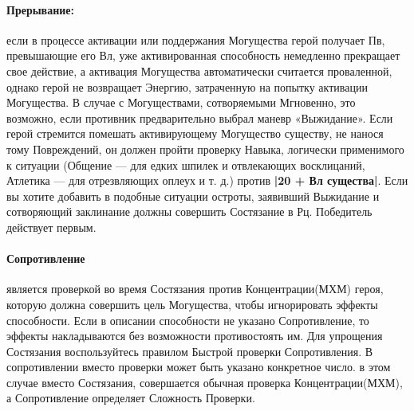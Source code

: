 \paragraph{Прерывание:} если в процессе активации или поддержания Могущества герой получает Пв, превышающие его Вл, уже активированная способность немедленно прекращает свое действие, а активация Могущества автоматически считается проваленной, однако герой не возвращает Энергию, затраченную на попытку активации Могущества. В случае с Могуществами, сотворяемыми Мгновенно, это возможно, если противник предварительно выбрал маневр «Выжидание».
\newline
Если герой стремится помешать активирующему Могущество существу, не нанося тому Повреждений, он должен пройти проверку Навыка, логически применимого к ситуации (Общение — для едких шпилек и отвлекающих восклицаний, Атлетика — для отрезвляющих оплеух и т. д.) против \textbf{|20 + Вл существа|}.
\newline
Если вы хотите добавить в подобные ситуации остроты, заявивший Выжидание и сотворяющий заклинание должны совершить Состязание в Рц. Победитель действует первым.
\paragraph{Сопротивление} является проверкой во время Состязания против Концентрации(МХМ) героя, которую должна совершить цель Могущества, чтобы игнорировать эффекты способности. Если в описании способности не указано Сопротивление, то эффекты накладываются без возможности противостоять им. Для упрощения Состязания воспользуйтесь правилом Быстрой проверки Сопротивления. В сопротивлении вместо проверки может быть указано конкретное число. в этом случае вместо Состязания, совершается обычная проверка Концентрации(МХМ), а Сопротивление определяет Сложность Проверки.


